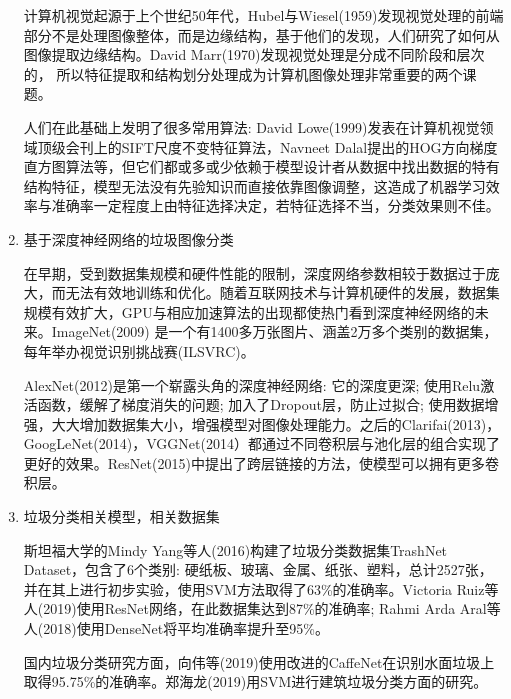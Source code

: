 \documentclass[a4paper]{article}
\begin{document}
\begin{CJK*}{UTF8}{gbsn}
\begin{enumerate}
计算机视觉起源于上个世纪50年代，Hubel与Wiesel(1959)发现视觉处理的前端部分不是处理图像整体，而是边缘结构，基于他们的发现，人们研究了如何从图像提取边缘结构。David Marr(1970)发现视觉处理是分成不同阶段和层次的，
所以特征提取和结构划分处理成为计算机图像处理非常重要的两个课题。

人们在此基础上发明了很多常用算法: David Lowe(1999)发表在计算机视觉领域顶级会刊上的SIFT尺度不变特征算法\cite{790410}，Navneet Dalal提出的HOG方向梯度直方图算法\cite{dalal2005histograms}等，但它们都或多或少依赖于模型设计者从数据中找出数据的特有结构特征，模型无法没有先验知识而直接依靠图像调整，这造成了机器学习效率与准确率一定程度上由特征选择决定，若特征选择不当，分类效果则不佳。

\item 基于深度神经网络的垃圾图像分类

在早期，受到数据集规模和硬件性能的限制，深度网络参数相较于数据过于庞大，而无法有效地训练和优化。随着互联网技术与计算机硬件的发展，数据集规模有效扩大，GPU与相应加速算法的出现都使热门看到深度神经网络的未来。ImageNet(2009) 是一个有1400多万张图片、涵盖2万多个类别的数据集，每年举办视觉识别挑战赛(ILSVRC)。

AlexNet(2012)是第一个崭露头角的深度神经网络: 它的深度更深; 使用Relu激活函数，缓解了梯度消失的问题; 加入了Dropout层，防止过拟合; 使用数据增强，大大增加数据集大小，增强模型对图像处理能力。之后的Clarifai(2013)，GoogLeNet(2014)，VGGNet(2014）都通过不同卷积层与池化层的组合实现了更好的效果。ResNet(2015)中提出了跨层链接的方法，使模型可以拥有更多卷积层。

\item 垃圾分类相关模型，相关数据集

斯坦福大学的Mindy Yang等人(2016)构建了垃圾分类数据集TrashNet Dataset，包含了6个类别: 硬纸板、玻璃、金属、纸张、塑料，总计2527张，并在其上进行初步实验，使用SVM方法\cite{yang2016classification}取得了63\%的准确率。Victoria Ruiz等人(2019)使用ResNet网络，在此数据集达到87\%的准确率; Rahmi Arda Aral等人(2018)使用DenseNet将平均准确率提升至95\%。

国内垃圾分类研究方面，向伟等(2019)使用改进的CaffeNet在识别水面垃圾上取得95.75\%的准确率。郑海龙(2019)用SVM进行建筑垃圾分类方面的研究。


\end{enumerate}
\end{CJK*}
\end{document}
